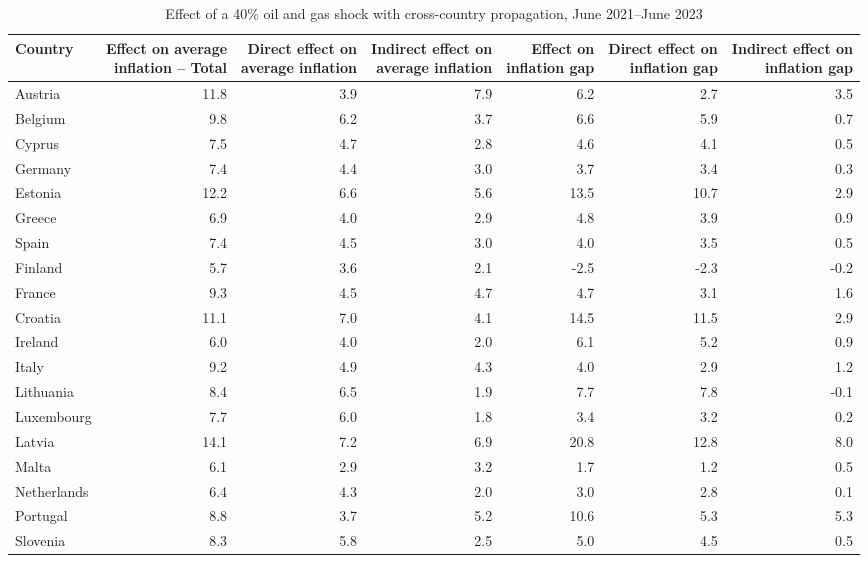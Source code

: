 \begin{table}[H]
\centering
\caption{Effect of a 40\% oil and gas shock with cross-country propagation, June 2021--June 2023}
\label{tab:shock-oil-gas-chain-ea20}
\scriptsize
\setlength{\tabcolsep}{1.2pt}
\begin{tabular}{lrrrrrr}
\toprule
Country & \shortstack{Effect on average\\inflation -- Total} & \shortstack{Direct effect on\\average inflation} & \shortstack{Indirect effect on\\average inflation} & \shortstack{Effect on\\inflation gap} & \shortstack{Direct effect on\\inflation gap} & \shortstack{Indirect effect on\\inflation gap}
 \\
\midrule
Austria & 11.8 & 3.9 & 7.9 & 6.2 & 2.7 & 3.5
 \\
Belgium & 9.8 & 6.2 & 3.7 & 6.6 & 5.9 & 0.7
 \\
Cyprus & 7.5 & 4.7 & 2.8 & 4.6 & 4.1 & 0.5
 \\
Germany & 7.4 & 4.4 & 3.0 & 3.7 & 3.4 & 0.3
 \\
Estonia & 12.2 & 6.6 & 5.6 & 13.5 & 10.7 & 2.9
 \\
Greece & 6.9 & 4.0 & 2.9 & 4.8 & 3.9 & 0.9
 \\
Spain & 7.4 & 4.5 & 3.0 & 4.0 & 3.5 & 0.5
 \\
Finland & 5.7 & 3.6 & 2.1 & -2.5 & -2.3 & -0.2
 \\
France & 9.3 & 4.5 & 4.7 & 4.7 & 3.1 & 1.6
 \\
Croatia & 11.1 & 7.0 & 4.1 & 14.5 & 11.5 & 2.9
 \\
Ireland & 6.0 & 4.0 & 2.0 & 6.1 & 5.2 & 0.9
 \\
Italy & 9.2 & 4.9 & 4.3 & 4.0 & 2.9 & 1.2
 \\
Lithuania & 8.4 & 6.5 & 1.9 & 7.7 & 7.8 & -0.1
 \\
Luxembourg & 7.7 & 6.0 & 1.8 & 3.4 & 3.2 & 0.2
 \\
Latvia & 14.1 & 7.2 & 6.9 & 20.8 & 12.8 & 8.0
 \\
Malta & 6.1 & 2.9 & 3.2 & 1.7 & 1.2 & 0.5
 \\
Netherlands & 6.4 & 4.3 & 2.0 & 3.0 & 2.8 & 0.1
 \\
Portugal & 8.8 & 3.7 & 5.2 & 10.6 & 5.3 & 5.3
 \\
Slovenia & 8.3 & 5.8 & 2.5 & 5.0 & 4.5 & 0.5
 \\

\end{tabular}
\end{table}
